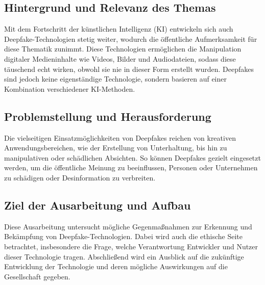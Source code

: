 \documentclass[a4paper,12pt]{article}
\begin{document}
\subsection{Hintergrund und Relevanz des Themas}
Mit dem Fortschritt der künstlichen Intelligenz (KI) entwickeln sich auch Deepfake-Technologien stetig weiter, 
wodurch die öffentliche Aufmerksamkeit für diese Thematik zunimmt. 
Diese Technologien ermöglichen die Manipulation digitaler Medieninhalte wie Videos, 
Bilder und Audiodateien, sodass diese täuschend echt wirken, 
obwohl sie nie in dieser Form erstellt wurden. 
Deepfakes sind jedoch keine eigenständige Technologie, 
sondern basieren auf einer Kombination verschiedener KI-Methoden. \cite{BVDW2024}\\

\subsection{Problemstellung und Herausforderung}
Die vielseitigen Einsatzmöglichkeiten von Deepfakes reichen von kreativen Anwendungsbereichen, 
wie der Erstellung von Unterhaltung, bis hin zu manipulativen oder schädlichen Absichten. 
So können Deepfakes gezielt eingesetzt werden, um die öffentliche Meinung zu beeinflussen, 
Personen oder Unternehmen zu schädigen oder Desinformation zu verbreiten. \cite{CounterExtremism2020}\\

\subsection{Ziel der Ausarbeitung und Aufbau}
Diese Ausarbeitung untersucht mögliche Gegenmaßnahmen zur Erkennung und Bekämpfung von Deepfake-Technologien. 
Dabei wird auch die ethische Seite betrachtet, 
insbesondere die Frage, welche Verantwortung Entwickler und Nutzer dieser Technologie tragen. 
Abschließend wird ein Ausblick auf die zukünftige Entwicklung der Technologie und deren mögliche Auswirkungen auf die Gesellschaft gegeben.
\newpage

\end{document}
